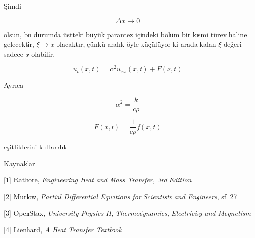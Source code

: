 \documentclass[12pt,fleqn]{article}\usepackage{../../common}
\begin{document}
Şimdi 

$$ \Delta x \to 0 $$

olsun, bu durumda üstteki büyük parantez içindeki bölüm bir kısmi türev
haline gelecektir, $\xi \to x$ olacaktır, çünkü aralık öyle küçülüyor ki
arada kalan $\xi$ değeri sadece $x$ olabilir.

$$ u_t(x,t) = \alpha^2u_{xx}(x,t) + F(x,t) $$

Ayrıca

$$ \alpha^2 = \frac{k}{c\rho} $$

$$ F(x,t) = \frac{1}{c\rho}f(x,t) $$

eşitliklerini kullandık.



Kaynaklar

[1] Rathore, {\em Engineering Heat and Mass Transfer, 3rd Edition}

[2] Murlow, {\em Partial Differential Equations for Scientists and Engineers}, sf. 27

[3] OpenStax, {\em University Physics II, Thermodynamics, Electricity and Magnetism}

[4] Lienhard, {\em A Heat Transfer Textbook}
\end{document}

